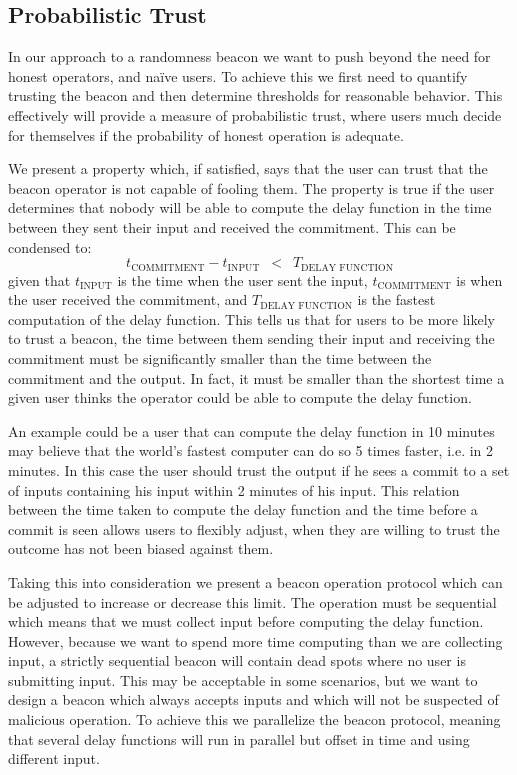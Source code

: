 \subsection{Probabilistic Trust}%
\label{sub:probabilistic_trust}
In our approach to a randomness beacon we want to push beyond the need for honest operators, and naïve users.
To achieve this we first need to quantify trusting the beacon and then determine thresholds for reasonable behavior.
This effectively will provide a measure of probabilistic trust, where users much decide for themselves if the probability of honest operation is adequate.

We present a property which, if satisfied, says that the user can trust that the beacon operator is not capable of fooling them.
The property is true if the user determines that nobody will be able to compute the delay function in the time between they sent their input and received the commitment.
This can be condensed to:
\begin{equation*}
    t_\text{COMMITMENT} - t_\text{INPUT}\enspace <\enspace T_\text{DELAY FUNCTION}
\end{equation*}
given that $t_\text{INPUT}$ is the time when the user sent the input, $t_\text{COMMITMENT}$ is when the user received the commitment, and $T_\text{DELAY FUNCTION}$ is the fastest computation of the delay function.
This tells us that for users to be more likely to trust a beacon, the time between them sending their input and receiving the commitment must be significantly smaller than the time between the commitment and the output.
In fact, it must be smaller than the shortest time a given user thinks the operator could be able to compute the delay function.

An example could be a user that can compute the delay function in 10 minutes may believe that the world's fastest computer can do so 5 times faster, i.e. in 2 minutes. In this case the user should trust the output if he sees a commit to a set of inputs containing his input within 2 minutes of his input.
This relation between the time taken to compute the delay function and the time before a commit is seen allows users to flexibly adjust, when they are willing to trust the outcome has not been biased against them.

Taking this into consideration we present a beacon operation protocol which can be adjusted to increase or decrease this limit.
The operation must be sequential which means that we must collect input before computing the delay function.
However, because we want to spend more time computing than we are collecting input, a strictly sequential beacon will contain dead spots where no user is submitting input.
This may be acceptable in some scenarios, but we want to design a beacon which always accepts inputs and which will not be suspected of malicious operation.
To achieve this we parallelize the beacon protocol, meaning that several delay functions will run in parallel but offset in time and using different input.

